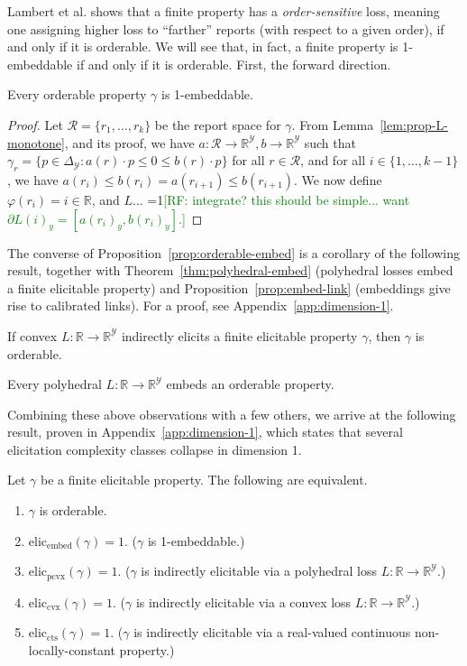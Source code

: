 \documentclass[11pt]{colt2019}
\newcommand{\Comments}{1}
\newcommand{\mynote}[2]{\ifnum\Comments=1\textcolor{#1}{#2}\fi}
\newcommand{\raf}[1]{\mynote{green}{[RF: #1]}}
\newcommand{\reals}{\mathbb{R}}
\newcommand{\eliccts}{\mathrm{elic}_\mathrm{cts}}
\newcommand{\eliccvx}{\mathrm{elic}_\mathrm{cvx}}
\newcommand{\elicpoly}{\mathrm{elic}_\mathrm{pcvx}}
\newcommand{\elicembed}{\mathrm{elic}_\mathrm{embed}}
\newcommand{\simplex}{\Delta_\Y}
\newcommand{\R}{\mathcal{R}}
\newcommand{\Y}{\mathcal{Y}}
\begin{document}
Lambert et al. shows that a finite property has a \emph{order-sensitive} loss, meaning one assigning higher loss to ``farther'' reports (with respect to a given order), if and only if it is orderable.
We will see that, in fact, a finite property is 1-embeddable if and only if it is orderable.
First, the forward direction.

\begin{proposition}\label{prop:orderable-embed}
  Every orderable property $\gamma$ is 1-embeddable.
\end{proposition}
\begin{proof}
  Let $\R = \{r_1,\ldots,r_k\}$ be the report space for $\gamma$.
  From Lemma~\ref{lem:prop-L-monotone}, and its proof, we have $a:\R\to\reals^\Y, b\to\reals^\Y$ such that $\gamma_r = \{p\in\simplex : a(r) \cdot p \leq 0 \leq b(r) \cdot p\}$ for all $r\in\R$, and for all $i \in \{1,\ldots,k-1\}$, we have $a(r_i) \leq b(r_i) = a(r_{i+1}) \leq b(r_{i+1})$.
  We now define $\varphi(r_i) = i \in \reals$, and $L$... \raf{integrate?  this should be simple... want $\partial L(i)_y = [a(r_i)_y,b(r_i)_y]$.}
\end{proof}

The converse of Proposition~\ref{prop:orderable-embed} is a corollary of the following result, together with Theorem~\ref{thm:polyhedral-embed} (polyhedral losses embed a finite elicitable property) and Proposition~\ref{prop:embed-link} (embeddings give rise to calibrated links).
For a proof, see Appendix~\ref{app:dimension-1}.
\begin{proposition}\label{prop:indirect-orderable}
  If convex $L : \reals \to \reals^\Y$ indirectly elicits a finite elicitable property $\gamma$, then $\gamma$ is orderable.
\end{proposition}

\begin{corollary}\label{cor:embed-orderable}
  Every polyhedral $L : \reals \to \reals^\Y$ embeds an orderable property.
\end{corollary}


Combining these above observations with a few others, we arrive at the following result, proven in Appendix~\ref{app:dimension-1}, which states that several elicitation complexity classes collapse in dimension 1.
\begin{theorem}
  Let $\gamma$ be a finite elicitable property.
  The following are equivalent.
  \begin{enumerate}
  \item $\gamma$ is orderable.
  \item $\elicembed(\gamma)=1$. ($\gamma$ is 1-embeddable.)
  \item $\elicpoly(\gamma)=1$. ($\gamma$ is indirectly elicitable via a polyhedral loss $L:\reals\to\reals^\Y$.)
  \item $\eliccvx(\gamma)=1$. ($\gamma$ is indirectly elicitable via a convex loss $L:\reals\to\reals^\Y$.)
  \item $\eliccts(\gamma)=1$. ($\gamma$ is indirectly elicitable via a real-valued continuous non-locally-constant property.)
  \end{enumerate}
\end{theorem}
\end{document}
